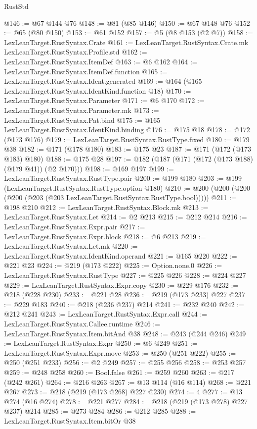 \begin{lexlean}{RustStd}
\begin{coremodule}
@146 := @67 @144 @76
@148 := @81 (@85 @146)
@150 := @67 @148 @76
@152 := @65 (@80 @150)
@153 := @61 @152
@157 := @5 (@8 @153 (@2 @7))
@158 := LexLeanTarget.RustSyntax.Crate
@161 := LexLeanTarget.RustSyntax.Crate.mk LexLeanTarget.RustSyntax.Profile.std
@162 := LexLeanTarget.RustSyntax.ItemDef
@163 := @6 @162
@164 := LexLeanTarget.RustSyntax.ItemDef.function
@165 := LexLeanTarget.RustSyntax.Ident.generated
@169 := @164 (@165 LexLeanTarget.RustSyntax.IdentKind.function @18)
@170 := LexLeanTarget.RustSyntax.Parameter
@171 := @6 @170
@172 := LexLeanTarget.RustSyntax.Parameter.mk
@173 := LexLeanTarget.RustSyntax.Pat.bind
@175 := @165 LexLeanTarget.RustSyntax.IdentKind.binding
@176 := @175 @18
@178 := @172 (@173 @176)
@179 := LexLeanTarget.RustSyntax.RustType.fixed
@180 := @179 @38
@182 := @171 (@178 @180)
@183 := @175 @23
@187 := @171 (@172 (@173 @183) @180)
@188 := @175 @28
@197 := @182 (@187 (@171 (@172 (@173 @188) (@179 @41)) (@2 @170)))
@198 := @169 @197
@199 := LexLeanTarget.RustSyntax.RustType.pair
@200 := @199 @180
@203 := @199 (LexLeanTarget.RustSyntax.RustType.option @180)
@210 := @200 (@200 (@200 (@200 (@203 (@203 LexLeanTarget.RustSyntax.RustType.bool)))))
@211 := @198 @210
@212 := LexLeanTarget.RustSyntax.Block.mk
@213 := LexLeanTarget.RustSyntax.Let
@214 := @2 @213
@215 := @212 @214
@216 := LexLeanTarget.RustSyntax.Expr.pair
@217 := LexLeanTarget.RustSyntax.Expr.block
@218 := @6 @213
@219 := LexLeanTarget.RustSyntax.Let.mk
@220 := LexLeanTarget.RustSyntax.IdentKind.operand
@221 := @165 @220
@222 := @221 @23
@224 := @219 (@173 @222)
@225 := Option.none.{0}
@226 := LexLeanTarget.RustSyntax.RustType
@227 := @225 @226
@228 := @224 @227
@229 := LexLeanTarget.RustSyntax.Expr.copy
@230 := @229 @176
@232 := @218 (@228 @230)
@233 := @221 @28
@236 := @219 (@173 @233) @227
@237 := @229 @183
@240 := @218 (@236 @237) @214
@241 := @232 @240
@242 := @212 @241
@243 := LexLeanTarget.RustSyntax.Expr.call
@244 := LexLeanTarget.RustSyntax.Callee.runtime
@246 := LexLeanTarget.RustSyntax.Item.bitAnd @38
@248 := @243 (@244 @246)
@249 := LexLeanTarget.RustSyntax.Expr
@250 := @6 @249
@251 := LexLeanTarget.RustSyntax.Expr.move
@253 := @250 (@251 @222)
@255 := @250 (@251 @233)
@256 := @2 @249
@257 := @255 @256
@258 := @253 @257
@259 := @248 @258
@260 := Bool.false
@261 := @259 @260
@263 := @217 (@242 @261)
@264 := @216 @263
@267 := @13 @114 (@16 @114)
@268 := @221 @267
@273 := @218 (@219 (@173 @268) @227 @230)
@274 := 4
@277 := @13 @274 (@16 @274)
@278 := @221 @277
@284 := @218 (@219 (@173 @278) @227 @237) @214
@285 := @273 @284
@286 := @212 @285
@288 := LexLeanTarget.RustSyntax.Item.bitOr @38

\end{coremodule}
\end{lexlean}

